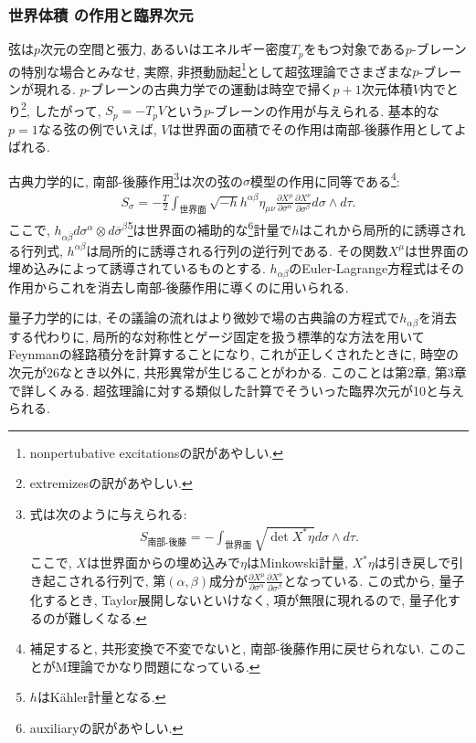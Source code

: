 \documentclass[10pt,a4paper]{jsarticle}
\begin{document}
\subsubsection*{世界体積%
の作用と臨界次元}
弦は$p$次元の空間と張力, あるいはエネルギー密度$T_p$をもつ対象である$p$-ブレーンの特別な場合とみなせ, 実際, 非摂動励起\footnote{nonpertubative excitationsの訳があやしい. }として超弦理論でさまざまな$p$-ブレーンが現れる. $p$-ブレーンの古典力学での運動は時空で掃く$p+1$次元体積$V$内でとり\footnote{extremizesの訳があやしい. }, したがって, $S_p = - T_p V$という$p$-ブレーンの作用が与えられる. 基本的な$p = 1$なる弦の例でいえば, $V$は世界面の面積でその作用は南部-後藤作用としてよばれる. \par
古典力学的に, 南部-後藤作用\footnote{
    式は次のように与えられる: 
    \begin{align*}
        S_{\text{南部-後藤}} = - \int_{世界面} \sqrt{\det X^* \eta } d \sigma \wedge d \tau .
    \end{align*}
    ここで, $X$は世界面からの埋め込みで$\eta $はMinkowski計量, $X^* \eta $は引き戻しで引き起こされる行列で, 第$\left( \alpha , \beta \right) $成分が$\frac{\partial X^{\mu}}{\partial \sigma^{\alpha}} \frac{\partial X^{\nu}}{\partial \sigma^{\beta}} $となっている. この式から, 量子化するとき, Taylor展開しないといけなく, 項が無限に現れるので, 量子化するのが難しくなる. 
}は次の弦の$\sigma$模型の作用に同等である\footnote{補足すると, 共形変換で不変でないと, 南部-後藤作用に戻せられない. このことがM理論でかなり問題になっている. }: 
\begin{align*}
    S_{\sigma} = - \frac{T}{2} \int_{\text{世界面}} \sqrt{- h } h^{\alpha \beta } \eta_{\mu \nu } \frac{\partial X^{\mu}}{\partial \sigma^{\alpha}} \frac{\partial X^{\nu}}{\partial \sigma^{\beta}} d \sigma \wedge d \tau. 
\end{align*}
ここで, $h_{\alpha \overline{\beta}} d \sigma^{\alpha} \otimes d \overline{\sigma }^{\beta} $\footnote{$h$はKähler計量となる. }は世界面の補助的な\footnote{auxiliaryの訳があやしい. }計量で$h$はこれから局所的に誘導される行列式, $h^{\alpha \beta } $は局所的に誘導される行列の逆行列である. その関数$X^{\mu}$は世界面の埋め込みによって誘導されているものとする. $h_{\alpha \beta } $のEuler-Lagrange方程式はその作用からこれを消去し南部-後藤作用に導くのに用いられる. \par
量子力学的には, その議論の流れはより微妙で場の古典論の方程式で$h_{\alpha \beta} $を消去する代わりに, 局所的な対称性とゲージ固定を扱う標準的な方法を用いてFeynmanの経路積分を計算することになり, これが正しくされたときに, 時空の次元が26なとき以外に, 共形異常が生じることがわかる. このことは第2章, 第3章で詳しくみる. 超弦理論に対する類似した計算でそういった臨界次元が10と与えられる. 
\end{document}
